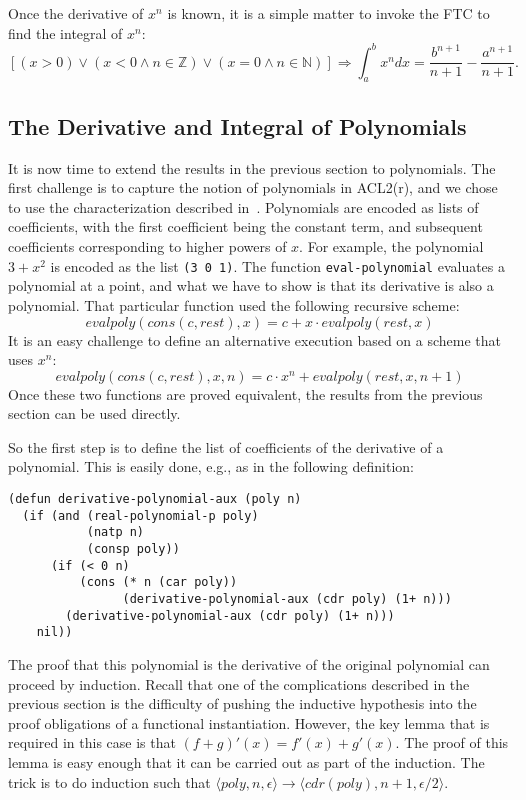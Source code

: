 \documentclass[copyright,creativecommons]{eptcs}
\begin{document}
Once the derivative of $x^n$ is known, it is a simple matter to invoke
the FTC to find the integral of $x^n$:
\begin{equation}
\left[
(x>0) \vee 
(x<0 \wedge n \in \mathbb{Z}) \vee
(x=0 \wedge n \in \mathbb{N}) \right] \Rightarrow
\int_{a}^{b}{x^n dx} = \frac{b^{n+1}}{n+1} - \frac{a^{n+1}}{n+1}.
\end{equation}

\subsection{The Derivative and Integral of Polynomials}

It is now time to extend the results in the previous section to
polynomials. The first challenge is to capture the notion of
polynomials in ACL2(r), and we chose to use the characterization 
described in~\cite{GaCo:cantor-trio}. Polynomials are encoded as lists
of coefficients, with the first coefficient being the constant term,
and subsequent coefficients corresponding to higher powers of $x$. For
example, the polynomial $3 + x^2$ is encoded as the list \texttt{(3 0 1)}.
The function \texttt{eval-polynomial} evaluates a polynomial at a point, and
what we have to show is that its derivative is also a polynomial.
That particular function used the following recursive scheme:
\begin{equation}
evalpoly(cons(c,rest), x) = c + x\cdot evalpoly(rest, x)
\end{equation}
It is an easy challenge to define an alternative execution based on a
scheme that uses $x^n$:
\begin{equation}
evalpoly(cons(c,rest), x, n) = c\cdot x^n + evalpoly(rest, x, n+1)
\end{equation}
Once these two functions are proved equivalent, the results from the
previous section can be used directly.

So the first step is to define the list of coefficients of the
derivative of a polynomial. This is easily done, e.g., as in the
following definition:
\begin{lstlisting}
(defun derivative-polynomial-aux (poly n)
  (if (and (real-polynomial-p poly)
           (natp n)
           (consp poly))
      (if (< 0 n)
          (cons (* n (car poly))
                (derivative-polynomial-aux (cdr poly) (1+ n)))
        (derivative-polynomial-aux (cdr poly) (1+ n)))
    nil))
\end{lstlisting}
The proof that this polynomial is the derivative of the original
polynomial can proceed by induction. Recall that one of the
complications described in the previous section is the difficulty of
pushing the inductive hypothesis into the proof obligations of a
functional instantiation. However, the key lemma that is required in
this case is that $(f+g)'(x) = f'(x)+g'(x)$. The proof of this lemma
is easy enough that it can be carried out as part of the
induction. The trick is to do induction such that $\langle poly, n,
\epsilon \rangle \rightarrow \langle cdr(poly), n+1, \epsilon/2
\rangle$.
\end{document}
